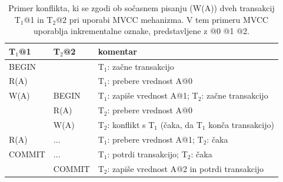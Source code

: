 \documentclass[a4paper, 12pt]{book}
\begin{document}
\begin{table}[H]
\begin{center}
\begin{tabular}{p{}|p{}|p{}} 
    \textbf{T$_{\text{1}}$@1} & \textbf{T$_{\text{2}}$@2} & \textbf{komentar} \\
\hline
BEGIN  &        & T$_{\text{1}}$: začne transakcijo \\
R(A)   &        & T$_{\text{1}}$: prebere vrednost A@0 \\
W(A)   & BEGIN  & T$_{\text{1}}$: zapiše vrednost A@1; T$_{\text{2}}$: začne transakcijo \\
        & R(A)   & T$_{\text{2}}$: prebere vrednost A@0  \\
        & W(A)   & T$_{\text{2}}$: konflikt s T$_{\text{1}}$ (čaka, da T$_{\text{1}}$ konča transakcijo) \\
R(A)   & ...    & T$_{\text{1}}$: prebere vrednost A@1; T$_{\text{2}}$: čaka \\
COMMIT & ...    & T$_{\text{1}}$: potrdi transakcijo; T$_{\text{2}}$: čaka \\
        & COMMIT & T$_{\text{2}}$: zapiše vrednost A@2 in potrdi transakcijo \\
\end{tabular}
\end{center}
\caption{Primer \cite{lecture-mvcc} konflikta, ki se zgodi ob sočasnem pisanju (W(A)) dveh transakcij T$_{\text{1}}$@1 in T$_{\text{2}}$@2 pri uporabi MVCC mehanizma. V tem primeru MVCC uporablja inkrementalne oznake, predstavljene z @0 @1 @2.}
\label{tbl_cc_mvcc_example}
\end{table}
\end{document}
